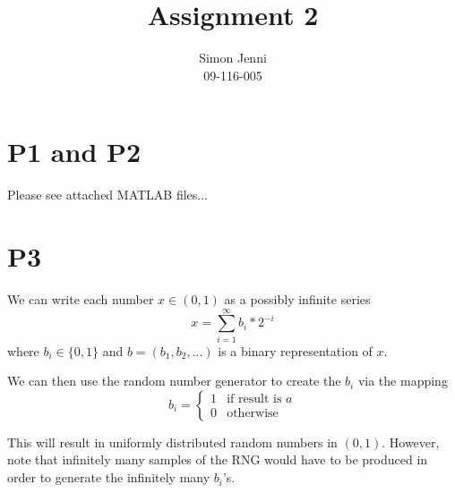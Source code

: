 \documentclass{paper}
\title{Assignment 2}
\author{Simon Jenni\\09-116-005}
\begin{document}
\maketitle


%

\section*{P1 and P2}
Please see attached MATLAB files...

\section*{P3}
We can write each number $x \in{(0,1)}$ as a possibly infinite series 
\begin{equation}
x = \sum_{i=1}^{\infty}b_i*2^{-i} 
\end{equation}
where $b_i\in{\{0, 1\}}$ and $b = (b_1, b_2, ...)$ is a binary representation of $x$. 

We can then use the random number generator to create the $b_i$ via the mapping 
\begin{equation}
b_i = 
\begin{cases}
    1& \text{if result is } a \\
    0              & \text{otherwise}
\end{cases}
\end{equation}

This will result in uniformly distributed random numbers in $(0,1)$. However, note that infinitely many samples of the RNG would have to be produced in order to generate the infinitely many $b_i$'s.

 
\end{document}
